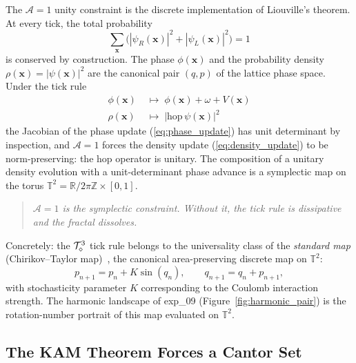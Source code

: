 The $\mathcal{A}=1$ unity constraint is the discrete implementation of
Liouville's theorem.  At every tick, the total probability
\begin{equation}
    \sum_{\mathbf{x}} \bigl(|\psi_R(\mathbf{x})|^2
                          + |\psi_L(\mathbf{x})|^2\bigr) = 1
\end{equation}
is conserved by construction.  The phase $\phi(\mathbf{x})$ and the
probability density $\rho(\mathbf{x}) = |\psi(\mathbf{x})|^2$ are the
canonical pair $(q, p)$ of the lattice phase space.
Under the tick rule
\begin{align}
    \phi(\mathbf{x}) &\;\mapsto\; \phi(\mathbf{x}) + \omega
        + V(\mathbf{x}) \label{eq:phase_update}\\
    \rho(\mathbf{x}) &\;\mapsto\; \bigl|\text{hop}\,\psi(\mathbf{x})\bigr|^2
        \label{eq:density_update}
\end{align}
the Jacobian of the phase update (\ref{eq:phase_update}) has unit
determinant by inspection, and $\mathcal{A}=1$ forces the density
update (\ref{eq:density_update}) to be norm-preserving: the hop
operator is unitary.
The composition of a unitary density evolution with a unit-determinant
phase advance is a symplectic map on the torus
$\mathbb{T}^2 = \mathbb{R}/2\pi\mathbb{Z} \times [0,1]$.

\begin{quote}
\textit{$\mathcal{A}=1$ is the symplectic constraint.
Without it, the tick rule is dissipative and the fractal dissolves.}
\end{quote}

Concretely: the $\mathcal{T}_\diamond^3$ tick rule belongs to the universality class
of the \emph{standard map} (Chirikov--Taylor map)~\cite{chirikov1979},
the canonical area-preserving discrete map on $\mathbb{T}^2$:
\begin{equation}
    p_{n+1} = p_n + K \sin(q_n), \qquad
    q_{n+1} = q_n + p_{n+1},
    \label{eq:standard_map}
\end{equation}
with stochasticity parameter $K$ corresponding to the Coulomb
interaction strength.
The harmonic landscape of exp\_09 (Figure~\ref{fig:harmonic_pair}) is the
rotation-number portrait of this map evaluated on $\mathbb{T}^2$.

\subsection{The KAM Theorem Forces a Cantor Set}
\label{subsec:kam}

